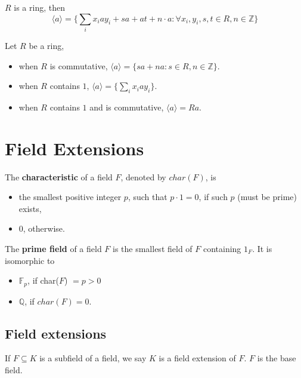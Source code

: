 \documentclass[11pt,fleqn]{book} %
\begin{document}
\begin{CJK}{UTF8}{gkai}
\begin{theorem}
	$R$ is a ring, then 
	\[
		\langle a \rangle = \{\sum_i x_i a y_i + sa + at + n\cdot a : \forall x_i,y_i,s,t \in R, n\in \mathbb{Z}\}\]
\end{theorem}

\begin{corollary}
	Let $R$ be a ring,
	\begin{itemize}
		\item when $R$ is commutative, $\langle a \rangle = \{sa + na : s\in R, n \in \mathbb{Z}\}$.
		\item when $R$ contains $1$, $\langle a \rangle = \{\sum_i x_iay_i\}$.
		\item when $R$ contains $1$ and is commutative, $\langle a \rangle = Ra$.
	\end{itemize}
\end{corollary}

\chapter{Field Extensions}
\begin{definition}
	The {\bf characteristic} of a field $F$, denoted by $char(F)$, is 
	\begin{itemize}
		\item the smallest positive integer $p$, such that $p\cdot 1 = 0$, if such $p$ (must be prime) exists, 
		\item $0$, otherwise.
	\end{itemize}
\end{definition}

\begin{definition}
	The {\bf prime field} of a field $F$ is the smallest field of $F$ containing $1_F$. It is isomorphic to
	\begin{itemize}
		\item $\mathbb{F}_p$, if char($F$) $=p > 0$
		\item $\mathbb{Q}$, if $char(F) = 0$. 
	\end{itemize}
\end{definition}

\section{Field extensions}

\begin{definition}
	If $F \subseteq K$ is a subfield of a field, we say $K$ is a field extension of $F$. $F$ is the base field. 


\end{definition}
\end{CJK}
\end{document}
